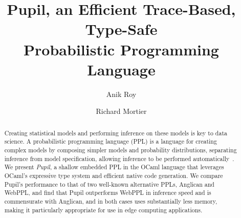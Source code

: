 \documentclass[sigconf]{acmart}
\newcommand{\pupil}{Pupil\xspace}
\begin{document}
\title[
  \pupil, an Efficient Trace-Based, Type-Safe Probabilistic Programming Language
]{
  \pupil, an Efficient Trace-Based, Type-Safe \\
  Probabilistic Programming Language
}

\author{Anik Roy}

\author{Richard Mortier}


\begin{abstract}
  Creating statistical models and performing inference on these models is key to data science. A probabilistic programming language (PPL) is a language for creating complex models by composing simpler models and probability distributions, separating inference from model specification, allowing inference to be performed automatically~\cite{gordon2014probabilistic}. We present \emph{\pupil}, a shallow embedded PPL in the OCaml language that leverages OCaml's expressive type system and efficient native code generation. We compare \pupil's performance to that of two well-known alternative PPLs, Anglican and WebPPL, and find that \pupil outperforms WebPPL in inference speed and is commensurate with Anglican, and in both cases uses substantially less memory, making it particularly appropriate for use in edge computing applications.
\end{abstract}
\end{document}
